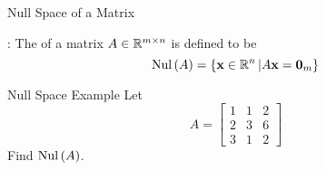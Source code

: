 \documentclass[xcoler=dvipsnames, aspectratio=169]{beamer}
\date{Null and Column Spaces}
\begin{document}
    \begin{frame}{Null Space of a Matrix}
        \begin{defn}
            : The  of a matrix $A\in\mathbb{R}^{m\times n}$ is defined
            to be\pause
            \[
                \mathrm{Nul}\left(A\right) = \left\{\mathbf{x}\in\mathbb{R}^n\left|A\mathbf{x}=\mathbf{0}_m\right\}\right.
            \]
        \end{defn}
    \end{frame}
    \begin{frame}{Null Space Example}
        \small
        Let
        \[
            A = \begin{bmatrix}
                1 & 1 & 2\\
                2 & 3 & 6\\
                3 & 1 & 2
            \end{bmatrix}
        \]
        Find $\mathrm{Nul}\left(A\right)$.
        \iftoggle{showSolutions}{
            \pause\ 
            Solve $A\vec{x} = \vec{0}_3$.
            \[
                \aMat{ccc|c}{
                    1 & 1 & 2 & 0\\
                    2 & 3 & 6 & 0\\
                    3 & 1 & 2 & 0
                }\pause\xrightarrow{R_2=R_2-2R_1}\aMat{ccc|c}{
                    1 & 1 & 2 & 0\\
                    0 & 1 & 2 & 0\\
                    3 & 1 & 2 & 0
                }\pause\xrightarrow{R_3=R_3-3R_1}\aMat{ccc|c}{
                    1 & 1 & 2 & 0\\
                    0 & 1 & 2 & 0\\
                    0 &-1 &-2 & 0
                }
            \]
            \[
                \pause\xrightarrow{R_3=R_3 + R_2}\aMat{ccc|c}{
                    1 & 1 & 2 & 0\\
                    0 & 1 & 2 & 0\\
                    0 & 0 & 0 & 0
                }\pause\xrightarrow{R_1=R_1 - R_2}\aMat{ccc|c}{
                    1 & 0 & 0 & 0\\
                    0 & 1 & 2 & 0\\
                    0 & 0 & 0 & 0
                }\rightarrow\vec{x} = \bMat{0\\-2t\\t}, t\in\R
            \]
        }{\vspace{130pt}}
    \end{frame}
\end{document}

